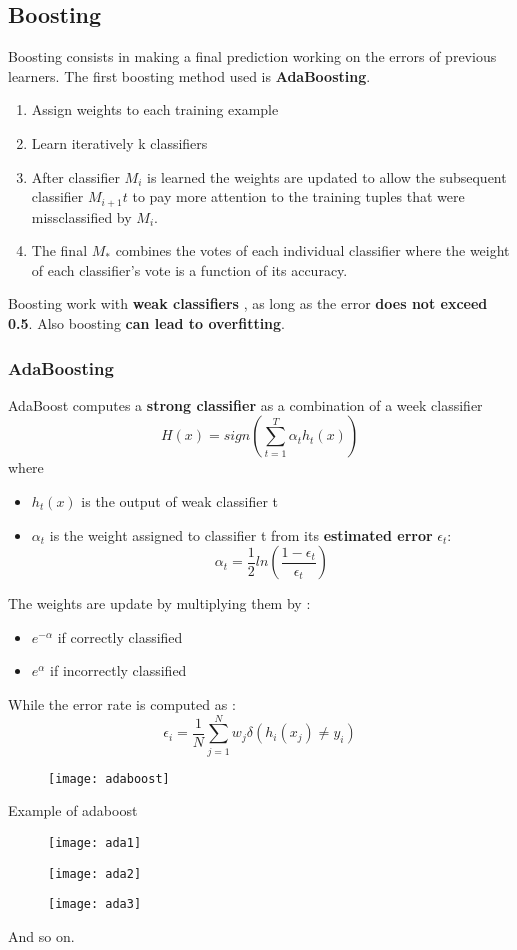 \subsection{Boosting}
Boosting consists in making a final prediction working on the errors of previous learners. The first boosting method used is \textbf{AdaBoosting}.
\begin{enumerate}
\item Assign weights to each training example
\item Learn iteratively k classifiers
\item After classifier $M_i$ is learned the weights are updated to allow the subsequent classifier $M_{i+1}t$ to pay more attention to the training tuples that were missclassified by $M_i$.
\item The final $M_*$ combines the votes of each individual classifier where the weight of each classifier's vote is a function of its accuracy.
\end{enumerate}
Boosting work with \textbf{weak classifiers} , as long as the error \textbf{does not exceed 0.5}. Also boosting \textbf{can lead to overfitting}.

\subsubsection{AdaBoosting}
AdaBoost computes a \textbf{strong classifier} as a combination of a week classifier 
$$ H(x) = sign \left(  \sum \limits_{t=1}^{T} \alpha_t h_t(x) \right)$$
where 
\begin{itemize}
\item $h_t(x) $ is the output of weak classifier t
\item $\alpha_t$ is the weight assigned to classifier t from its \textbf{estimated error } $\epsilon_t$:
$$ \alpha_t = \frac{1}{2} ln \left( \frac{1-\epsilon_t}{\epsilon_t} \right)$$
\end{itemize}

The weights are update by multiplying them by :
\begin{itemize}
\item $e^{-\alpha}$ if correctly classified
\item $e^{\alpha}$ if incorrectly classified
\end{itemize}
While the error rate is computed as :
$$ \epsilon_i = \frac{1}{N} \sum \limits_{j=1}^{N}w_j \delta(h_i(x_j) \neq y_i)$$
\begin{figure}[H]
  \centering
  \texttt{[image: adaboost]}
\end{figure}
Example of adaboost
\begin{figure}[H]
  \centering
  \texttt{[image: ada1]}
\end{figure}
\begin{figure}[H]
  \centering
  \texttt{[image: ada2]}
\end{figure}
\begin{figure}[H]
  \centering
  \texttt{[image: ada3]}
\end{figure}
And so on.\\


